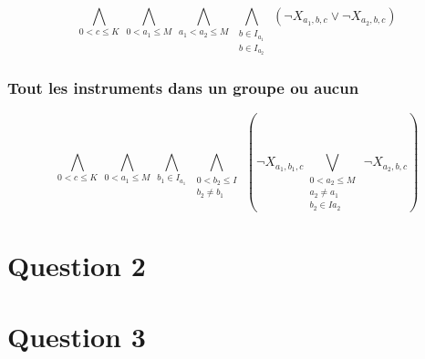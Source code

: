 \documentclass[11pt]{article}
\begin{document}
$$\bigwedge\limits_{0<c\le K}\ \bigwedge\limits_{0<a_1\le M}\ \bigwedge\limits_{a_1<a_2\le M}\ \bigwedge\limits_{\substack{b\in I_{a_1} \\ b\in I_{a_2}}}\ \left(\neg X_{a_1,b,c} \vee \neg X_{a_2,b,c}\right)$$

\subsubsection{Tout les instruments dans un groupe ou aucun}

$$\bigwedge\limits_{0<c\le K}\ \bigwedge\limits_{0<a_1\le M}\ \bigwedge\limits_{b_1\in I_{a_1}}\ \bigwedge\limits_{\substack{0<b_2\le I \\ b_2 \ne b_1}}\ \left(\neg X_{a_1,b_1,c} \bigvee\limits_{\substack{0<a_2\le M \\ a_2 \ne a_1 \\ b_2 \in I{a_2}}}\ \neg X_{a_2,b,c}\right)$$

\section{Question 2}

\section{Question 3}
\end{document}
